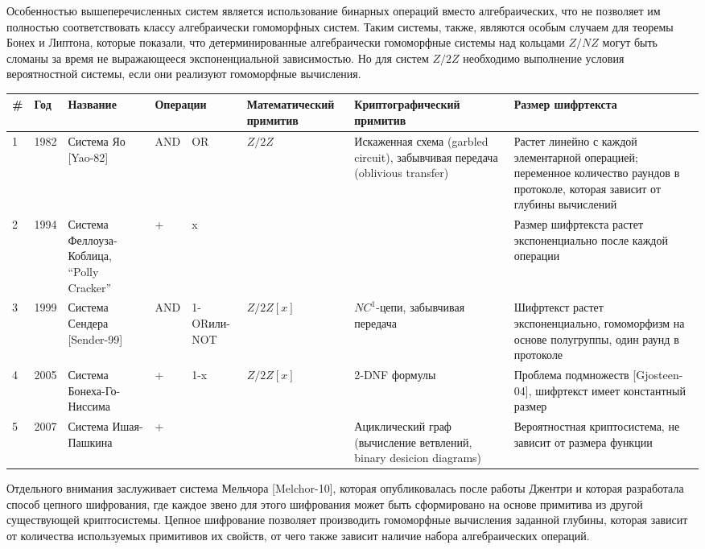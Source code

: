     Особенностью вышеперечисленных систем является использование бинарных операций вместо алгебраических, что не позволяет им полностью соответствовать классу алгебраически гомоморфных систем. Таким системы, также, являются особым случаем для теоремы Бонех и Липтона, которые показали, что детерминированные алгебраически гомоморфные системы над кольцами ${Z}/{NZ}$ могут быть сломаны за время не выражающееся экспоненциальной зависимостью. Но для систем ${Z}/{2}Z$ необходимо выполнение условия вероятностной системы, если они реализуют гомоморфные вычисления.

    \tiny
    \begin{longtable}{|p{0.1in}|p{0.3in}|p{0.6in}|p{0.2in}|p{0.3in}|p{0.7in}|p{0.8in}|p{1.3in}|} \hline 
    \#  & Год & Название & \multicolumn{2}{|p{0.5in}|}{Операции} & Математический примитив & Криптографический примитив & Размер шифртекста \\ \hline 
    1   & 1982 & Система Яо [Yao-82] & AND & OR & ${Z}/{2}Z$ & Искаженная схема (garbled circuit), забывчивая передача (oblivious transfer) & Растет линейно с каждой элементарной операцией; переменное количество раундов в протоколе, которая зависит от глубины вычислений \\ \hline 
    2   & 1994 & Система Феллоуза-Коблица, ``Polly Cracker'' & + & x &  &  & Размер шифртекста растет экспоненциально после каждой операции \\ \hline 
    3   & 1999 & Система Сендера [Sender-99] & AND & 1-OR\newline или\newline 1-NOT & ${Z}/{2}Z\left[x\right]$ & $NC^1$-цепи, забывчивая передача & Шифртекст растет экспоненциально, гомоморфизм на основе полугруппы, один раунд в протоколе \\ \hline 
    4   & 2005 & Система Бонеха-Го-Ниссима & + & 1-x & ${Z}/{2}Z\left[x\right]$ & 2-DNF формулы & Проблема подмножеств [Gjosteen-04], шифртекст имеет константный размер \\ \hline 
    5   & 2007 & Система Ишая-Пашкина & + &  &  & Ациклический граф (вычисление ветвлений, binary desicion diagrams) & Вероятностная криптосистема, не зависит от размера функции \\ \hline 
    \end{longtable}
    \normalsize
\normalcolor

    Отдельного внимания заслуживает система Мельчора [Melchor-10], которая опубликовалась после работы Джентри и которая разработала способ цепного шифрования, где каждое звено для этого шифрования может быть сформировано на основе примитива из другой существующей криптосистемы. Цепное шифрование позволяет производить гомоморфные вычисления заданной глубины, которая зависит от количества используемых примитивов их свойств, от чего также зависит наличие набора алгебраических операций.

